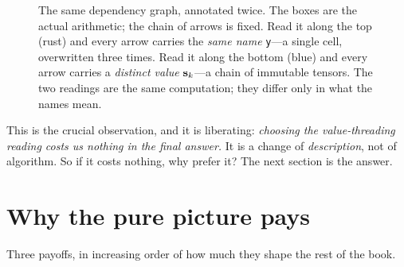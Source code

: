 \begin{figure}[t]
\centering
{}
\caption[One algorithm, two annotations]{The same dependency graph, annotated
twice. The boxes are the actual arithmetic; the chain of arrows is fixed. Read it
along the top (rust) and every arrow carries the \emph{same name} \texttt{y}---a
single cell, overwritten three times. Read it along the bottom (blue) and every
arrow carries a \emph{distinct value} $\mathbf{s}_k$---a chain of immutable tensors. The
two readings are the same computation; they differ only in what the names mean.}
\label{fig:twomodels}
\end{figure}

This is the crucial observation, and it is liberating: \emph{choosing the
value-threading reading costs us nothing in the final answer.} It is a change of
\emph{description}, not of algorithm. So if it costs nothing, why prefer it? The
next section is the answer.

\section{Why the pure picture pays}

Three payoffs, in increasing order of how much they shape the rest of the book.


